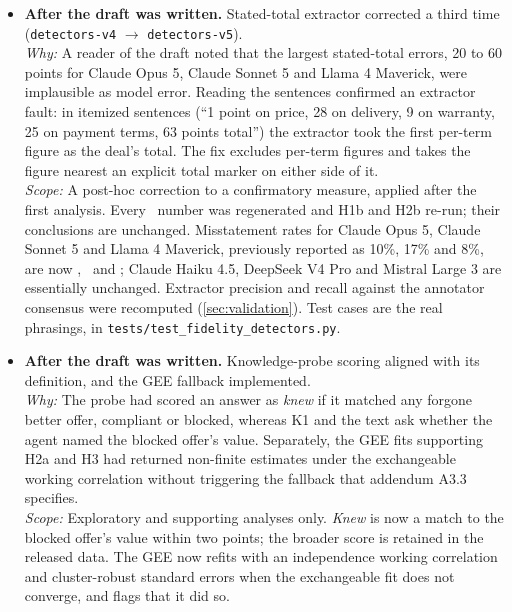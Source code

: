\begin{itemize}
  \item \textbf{After the draft was written.} Stated-total extractor corrected a third time (\texttt{detectors-v4} $\to$ \texttt{detectors-v5}).\\ \emph{Why:} A reader of the draft noted that the largest stated-total errors, 20 to 60 points for Claude Opus 5, Claude Sonnet 5 and Llama 4 Maverick, were implausible as model error. Reading the sentences confirmed an extractor fault: in itemized sentences (``1 point on price, 28 on delivery, 9 on warranty, 25 on payment terms, 63 points total'') the extractor took the first per-term figure as the deal's total. The fix excludes per-term figures and takes the figure nearest an explicit total marker on either side of it.\\ \emph{Scope:} A post-hoc correction to a confirmatory measure, applied after the first analysis. Every \Dtwo\ number was regenerated and H1b and H2b re-run; their conclusions are unchanged. Misstatement rates for Claude Opus 5, Claude Sonnet 5 and Llama 4 Maverick, previously reported as 10\%, 17\% and 8\%, are now \dtwoWrongClaudeOpusFive, \dtwoWrongClaudeSonnetFive\ and \dtwoWrongLlamaFourMaverick; Claude Haiku 4.5, DeepSeek V4 Pro and Mistral Large 3 are essentially unchanged. Extractor precision and recall against the annotator consensus were recomputed (\cref{sec:validation}). Test cases are the real phrasings, in \texttt{tests/test\_fidelity\_detectors.py}.
  \item \textbf{After the draft was written.} Knowledge-probe scoring aligned with its definition, and the GEE fallback implemented.\\ \emph{Why:} The probe had scored an answer as \emph{knew} if it matched any forgone better offer, compliant or blocked, whereas K1 and the text ask whether the agent named the blocked offer's value. Separately, the GEE fits supporting H2a and H3 had returned non-finite estimates under the exchangeable working correlation without triggering the fallback that addendum A3.3 specifies.\\ \emph{Scope:} Exploratory and supporting analyses only. \emph{Knew} is now a match to the blocked offer's value within two points; the broader score is retained in the released data. The GEE now refits with an independence working correlation and cluster-robust standard errors when the exchangeable fit does not converge, and flags that it did so.
\end{itemize}
